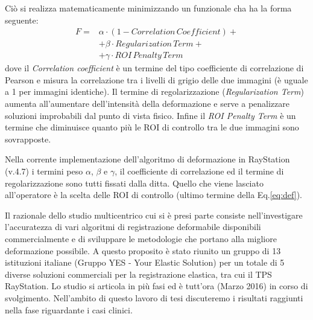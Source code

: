 Ciò si realizza matematicamente minimizzando un funzionale cha ha la forma seguente:
\begin{equation}
\label{eq:def}
\begin{split}
F =& \alpha \cdot (1- Correlation\, Coefficient) + \\
   & + \beta \cdot Regularization\,Term + \\
   & + \gamma \cdot ROI\,Penalty\,Term
\end{split}
\end{equation}
dove il \textit{Correlation coefficient} è un termine del tipo coefficiente di correlazione di Pearson e misura la correlazione tra i livelli di grigio delle due immagini (è uguale a 1 per immagini identiche). Il termine di regolarizzazione (\textit{Regularization Term}) aumenta all'aumentare dell'intensità della deformazione e serve a penalizzare soluzioni improbabili dal punto di vista fisico. Infine il \textit{ROI Penalty Term} è un termine che diminuisce quanto più le ROI di controllo tra le due immagini sono sovrapposte.

Nella corrente implementazione dell'algoritmo di deformazione in RayStation (v.4.7) i termini peso $\alpha$, $\beta$ e $\gamma$, il coefficiente di correlazione ed il termine di regolarizzazione sono tutti fissati dalla ditta. Quello che viene lasciato all'operatore è la scelta delle ROI di controllo (ultimo termine della Eq.\eqref{eq:def}).

Il razionale dello studio multicentrico cui si è presi parte consiste nell'investigare l'accuratezza di vari algoritmi di registrazione deformabile disponibili commercialmente e di sviluppare le metodologie che portano alla migliore deformazione possibile. A questo proposito è stato riunito un gruppo di 13 istituzioni italiane (Gruppo YES - Your Elastic Solution) per un totale di 5 diverse soluzioni commerciali per la registrazione elastica, tra cui il TPS RayStation. Lo studio si articola in più fasi ed è tutt'ora (Marzo 2016) in corso di svolgimento. Nell'ambito di questo lavoro di tesi discuteremo i risultati raggiunti nella fase riguardante i casi clinici.

